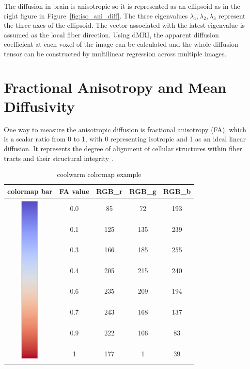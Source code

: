 \documentclass[hyperref, plainreport, noproblem]{cgvpub1}
\begin{document}
The diffusion in brain is anisotropic so it is represented as an ellipsoid as in the right figure in Figure~\ref{fig:iso_ani_diff}. The three eigenvalues  $\lambda_1, \lambda_2, \lambda_3$ represent the three axes of the ellipsoid. The vector associated with the latest eigenvalue is assumed as the local fiber direction.\cite{tak}
Using dMRI, the apparent diffusion coefficient at each voxel of the image can be calculated and the whole diffusion tensor can be constructed by multilinear regression across multiple images.

\section{Fractional Anisotropy and Mean Diffusivity }
One way to measure the anisotropic diffusion is fractional anisotropy (FA), which is a scalar ratio from 0 to 1, with 0 representing isotropic and 1 as an ideal linear diffusion. It represents the degree of alignment of cellular structures within fiber tracts and their structural integrity \cite{cer}.


\begin{table}[ht]
\caption{coolwarm colormap example}
\centering
\begin{tabular}{|c|c|c|c|c|}
\hline
colormap bar     & FA value & RGB\_r & RGB\_g & RGB\_b   \\ \hline
\multirow{8}{*}{\includegraphics{coolwarm_bar} } & 0.0      & 85     & 72     & 193      \\ [5pt] \cline{2-5}
	& 0.1      & 125    & 135    & 239      \\ [6pt] \cline{2-5}
	& 0.3      & 166    & 185    & 255      \\ [6pt] \cline{2-5}
	& 0.4      & 205    & 215    & 240      \\ [6pt] \cline{2-5}
	& 0.6      & 235    & 209    & 194      \\ [6pt] \cline{2-5}
	& 0.7      & 243    & 168    & 137      \\ [6pt] \cline{2-5}
	& 0.9      & 222    & 106    & 83       \\ [6pt] \cline{2-5}
	& 1        & 177    & 1      & 39      \\ [6pt] \hline
\end{tabular}
\label{tbl:coolwarm}
\end{table}
\end{document}
